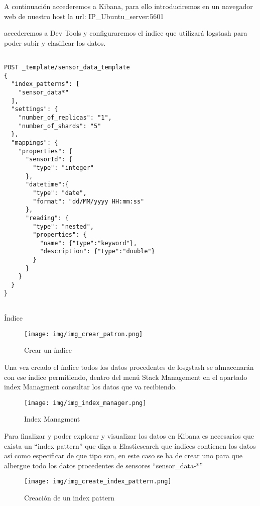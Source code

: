 A continuación accederemos a Kibana, para ello introduciremos en un navegador web de nuestro host la url: IP\_Ubuntu\_server:5601

accederemos a Dev Tools y configuraremos el índice que utilizará logstash para poder subir y clasificar los datos.


\begin{listing}
\begin{verbatim}

POST _template/sensor_data_template
{
  "index_patterns": [
    "sensor_data*"
  ],
  "settings": {
    "number_of_replicas": "1",
    "number_of_shards": "5"
  },
  "mappings": {
    "properties": {
      "sensorId": {
        "type": "integer"
      },
      "datetime":{
        "type": "date",
        "format": "dd/MM/yyyy HH:mm:ss"
      },
      "reading": {
        "type": "nested", 
        "properties": { 
          "name": {"type":"keyword"},
          "description": {"type":"double"}
        }
      }
    }
  }
}


\end{verbatim}
\caption{Índice} 
\label{json-transformado-example}
\end{listing}

\begin{figure}[h]
	\centering
	\texttt{[image: img/img\_crear\_patron.png]}
	\caption{Crear un índice}
	\label{img_index_pattern}
\end{figure}
\newpage

Una vez creado el índice todos los datos procedentes de losgstash se almacenarán con ese índice permitiendo, dentro del menú Stack Management en el apartado index Managment consultar los datos que va recibiendo.

\begin{figure}[h]
	\centering
	\texttt{[image: img/img\_index\_manager.png]}
	\caption{Index Managment}
	\label{img_index_manager.png}
\end{figure}

Para finalizar y poder explorar y visualizar los datos en Kibana es necesarios que exista un ``index pattern'' que diga a Elasticsearch que índices contienen los datos así como especificar de que tipo son, en este caso se ha de crear uno para que albergue todo los datos procedentes de sensores ``sensor\_data-*''\cite{pagina:elastic}

\begin{figure}[h]
	\centering
	\texttt{[image: img/img\_create\_index\_pattern.png]}
	\caption{Creación de un index pattern}
	\label{img_create_index_pattern.png}
\end{figure}

